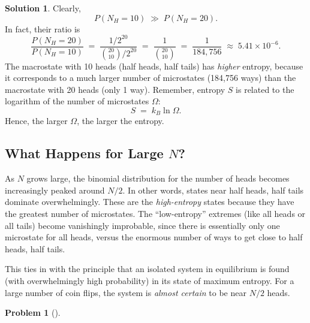 \documentclass[12pt]{article}
\theoremstyle{definition} %
\newtheorem{solution}{Solution}
\newtheorem{problem}{Problem}
\theoremstyle{plain} %
\begin{document}
\begin{solution}
Clearly, 
\[
P(N_H = 10) \;\gg\; P(N_H = 20).
\]
In fact, their ratio is
\[
\frac{P(N_H=20)}{P(N_H=10)}
\;=\;
\frac{1/2^{20}}{\binom{20}{10}/2^{20}}
\;=\;
\frac{1}{\binom{20}{10}}
\;=\;
\frac{1}{184{,}756}
\;\approx\; 5.41\times 10^{-6}.
\]
The macrostate with 10 heads (half heads, half tails) has 
\emph{higher} entropy, because it corresponds to a much larger number of 
microstates (184,756 ways) than the macrostate with 20 heads (only 1 way). 
Remember, entropy $S$ is related to the logarithm of the number of 
microstates $\Omega$:
\[
S \;=\; k_B \ln \Omega.
\]
Hence, the larger $\Omega$, the larger the entropy.

\subsection*{What Happens for Large $N$?}

As $N$ grows large, the binomial distribution for the number of heads 
becomes increasingly peaked around $N/2$. In other words, states near 
half heads, half tails dominate overwhelmingly. These are the 
\emph{high-entropy} states because they have the greatest number of 
microstates. The ``low-entropy'' extremes (like all heads or all tails) 
become vanishingly improbable, since there is essentially only one 
microstate for all heads, versus the enormous number of ways to get 
close to half heads, half tails. 

This ties in with the principle that an isolated system in equilibrium 
is found (with overwhelmingly high probability) in its state of maximum 
entropy. For a large number of coin flips, the system is \emph{almost 
certain} to be near $N/2$ heads.
\end{solution}
\begin{problem}[]
    
\end{problem}
\end{document}
